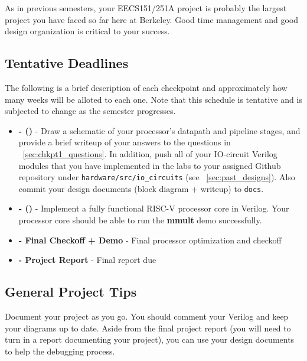 \documentclass[11pt]{article}
\begin{document}
As in previous semesters, your EECS151/251A project is probably the largest project you have faced so far here at Berkeley.
Good time management and good design organization is critical to your success.

\subsection{Tentative Deadlines}
\label{tentative_deadlines}
The following is a brief description of each checkpoint and approximately how many weeks will be alloted to each one. Note that this schedule is tentative and is subjected to change as the semester progresses.


\begin{itemize}
  \item \textbf{\blockDiagramDueDate \space - \blockDiagramTaskName \space (\blockDiagramTimeAlloted)} - Draw a schematic of your processor's datapath and pipeline stages, and provide a brief writeup of your answers to the questions in ~\ref{sec:chkpt1_questions}. In addition, push all of your IO-circuit Verilog modules that you have implemented in the labs to your assigned Github repository under \verb|hardware/src/io_circuits| (see ~\ref{sec:past_designs}). Also commit your design documents (block diagram + writeup) to \verb|docs|.
  \item \textbf{\baseCPUDueDate \space - \baseCPUTaskName \space (\baseCPUTimeAlloted)} - Implement a fully functional RISC-V processor core in Verilog. Your processor core should be able to run the \textbf{mmult} demo successfully.
  
  
  \item \textbf{\finalCheckoffDueDate \space - Final Checkoff + Demo} - Final processor optimization and checkoff
  \item \textbf{\finalReportDueDate \space - Project Report} - Final report due
\end{itemize}

\subsection{General Project Tips}
\label{tips}
Document your project as you go.
You should comment your Verilog and keep your diagrams up to date.
Aside from the final project report (you will need to turn in a report documenting your project), you can use your design documents to help the debugging process.
\end{document}
